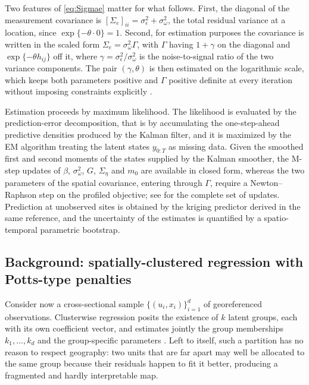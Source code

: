 Two features of \eqref{eq:Sigmae} matter for what follows. First, the diagonal of the measurement covariance is $[\Sigma_e]_{ii} = \sigma^2_\epsilon + \sigma^2_\omega$, the total residual variance at a location, since $\exp\{-\theta \cdot 0\} = 1$. Second, for estimation purposes the covariance is written in the scaled form $\Sigma_e = \sigma^2_\omega \Gamma$, with $\Gamma$ having $1 + \gamma$ on the diagonal and $\exp\{-\theta h_{ij}\}$ off it, where $\gamma = \sigma^2_\epsilon / \sigma^2_\omega$ is the noise-to-signal ratio of the two variance components. The pair $(\gamma, \theta)$ is then estimated on the logarithmic scale, which keeps both parameters positive and $\Gamma$ positive definite at every iteration without imposing constraints explicitly \citep{FassoCameletti2007}.

Estimation proceeds by maximum likelihood. The likelihood is evaluated by the prediction-error decomposition, that is by accumulating the one-step-ahead predictive densities produced by the Kalman filter, and it is maximized by the EM algorithm treating the latent states $y_{0:T}$ as missing data. Given the smoothed first and second moments of the states supplied by the Kalman smoother, the M-step updates of $\beta$, $\sigma^2_\omega$, $G$, $\Sigma_\eta$ and $m_0$ are available in closed form, whereas the two parameters of the spatial covariance, entering through $\Gamma$, require a Newton--Raphson step on the profiled objective; see \citet[Equations~(12)--(18)]{FassoCameletti2010} for the complete set of updates. Prediction at unobserved sites is obtained by the kriging predictor derived in the same reference, and the uncertainty of the estimates is quantified by a spatio-temporal parametric bootstrap.

\subsection{Background: spatially-clustered regression with Potts-type penalties}\label{sec2:scr}

Consider now a cross-sectional sample $\{(u_i, x_i)\}_{i=1}^{d}$ of georeferenced observations. Clusterwise regression posits the existence of $k$ latent groups, each with its own coefficient vector, and estimates jointly the group memberships $k_1,\ldots,k_d$ and the group-specific parameters \citep{desarbo1988maximum,spath1979algorithmus}. Left to itself, such a partition has no reason to respect geography: two units that are far apart may well be allocated to the same group because their residuals happen to fit it better, producing a fragmented and hardly interpretable map.

